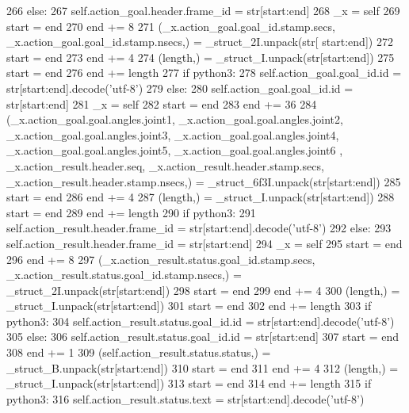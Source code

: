 \begin{DoxyCode}
266       \textcolor{keywordflow}{else}:
267         self.action\_goal.header.frame\_id = str[start:end]
268       \_x = self
269       start = end
270       end += 8
271       (\_x.action\_goal.goal\_id.stamp.secs, \_x.action\_goal.goal\_id.stamp.nsecs,) = \_struct\_2I.unpack(str[
      start:end])
272       start = end
273       end += 4
274       (length,) = \_struct\_I.unpack(str[start:end])
275       start = end
276       end += length
277       \textcolor{keywordflow}{if} python3:
278         self.action\_goal.goal\_id.id = str[start:end].decode(\textcolor{stringliteral}{'utf-8'})
279       \textcolor{keywordflow}{else}:
280         self.action\_goal.goal\_id.id = str[start:end]
281       \_x = self
282       start = end
283       end += 36
284       (\_x.action\_goal.goal.angles.joint1, \_x.action\_goal.goal.angles.joint2, 
      \_x.action\_goal.goal.angles.joint3, \_x.action\_goal.goal.angles.joint4, \_x.action\_goal.goal.angles.joint5, \_x.action\_goal.goal.angles.joint6
      , \_x.action\_result.header.seq, \_x.action\_result.header.stamp.secs, \_x.action\_result.header.stamp.nsecs,) = 
      \_struct\_6f3I.unpack(str[start:end])
285       start = end
286       end += 4
287       (length,) = \_struct\_I.unpack(str[start:end])
288       start = end
289       end += length
290       \textcolor{keywordflow}{if} python3:
291         self.action\_result.header.frame\_id = str[start:end].decode(\textcolor{stringliteral}{'utf-8'})
292       \textcolor{keywordflow}{else}:
293         self.action\_result.header.frame\_id = str[start:end]
294       \_x = self
295       start = end
296       end += 8
297       (\_x.action\_result.status.goal\_id.stamp.secs, \_x.action\_result.status.goal\_id.stamp.nsecs,) = 
      \_struct\_2I.unpack(str[start:end])
298       start = end
299       end += 4
300       (length,) = \_struct\_I.unpack(str[start:end])
301       start = end
302       end += length
303       \textcolor{keywordflow}{if} python3:
304         self.action\_result.status.goal\_id.id = str[start:end].decode(\textcolor{stringliteral}{'utf-8'})
305       \textcolor{keywordflow}{else}:
306         self.action\_result.status.goal\_id.id = str[start:end]
307       start = end
308       end += 1
309       (self.action\_result.status.status,) = \_struct\_B.unpack(str[start:end])
310       start = end
311       end += 4
312       (length,) = \_struct\_I.unpack(str[start:end])
313       start = end
314       end += length
315       \textcolor{keywordflow}{if} python3:
316         self.action\_result.status.text = str[start:end].decode(\textcolor{stringliteral}{'utf-8'})

\end{DoxyCode}

